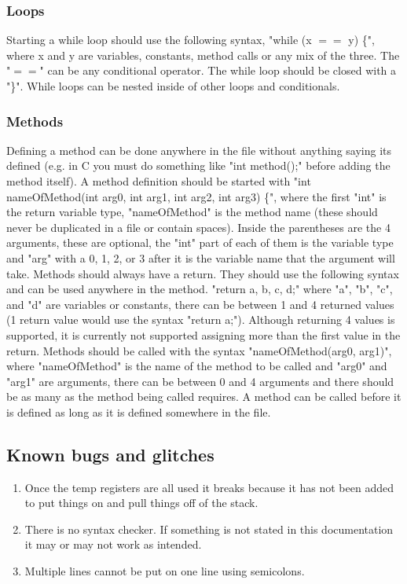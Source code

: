 		\subsubsection{Loops}
			Starting a while loop should use the following syntax, "while (x $==$ y) \{", where x and y are variables, constants, method calls or any mix of the three. The "$==$" can be any conditional operator.  The while loop should be closed with a "\}".  While loops can be nested inside of other loops and conditionals.
		\subsubsection{Methods}
			Defining a method can be done anywhere in the file without anything saying its defined (e.g. in C you must do something like "int method();" before adding the method itself).  A method definition should be started with "int nameOfMethod(int arg0, int arg1, int arg2, int arg3) \{", where the first "int" is the return variable type, "nameOfMethod" is the method name (these should never be duplicated in a file or contain spaces).  Inside the parentheses are the 4 arguments, these are optional, the "int" part of each of them is the variable type and "arg" with a 0, 1, 2, or 3 after it is the variable name that the argument will take.  Methods should always have a return.  They should use the following syntax and can be used anywhere in the method.  "return a, b, c, d;" where "a", "b", "c", and "d" are variables or constants, there can be between 1 and 4 returned values (1 return value would use the syntax "return a;").  Although returning 4 values is supported, it is currently not supported assigning more than the first value in the return.  Methods should be called with the syntax "nameOfMethod(arg0, arg1)", where "nameOfMethod" is the name of the method to be called and "arg0" and "arg1" are arguments, there can be between 0 and 4 arguments and there should be as many as the method being called requires.  A method can be called before it is defined as long as it is defined somewhere in the file.
	\subsection{Known bugs and glitches}
		\begin{enumerate}
			\item Once the temp registers are all used it breaks because it has not been added to put things on and pull things off of the stack.
			\item There is no syntax checker.  If something is not stated in this documentation it may or may not work as intended.
			\item Multiple lines cannot be put on one line using semicolons.
		\end{enumerate}

